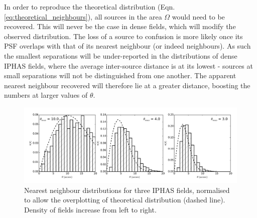 \documentclass[a4paper,useAMS,usenatbib]{mn2e}
\begin{document}


In order to reproduce the theoretical distribution (Eqn. \ref{eq:theoretical_neighbours}), all sources in the area $\Omega$ would need to be recovered. This will never be the case in dense fields, which will modify the observed distribution. The loss of a source to confusion is more likely once its PSF overlaps with that of its nearest neighbour (or indeed neighbours). As such
the smallest separations will be under-reported in the distributions of dense
IPHAS fields, where the average inter-source distance is at its lowest - sources at small separations will not be distinguished from one another. The apparent nearest neighbour recovered will therefore lie at a greater distance, boosting the numbers at larger values of $\theta$.

\begin{figure}
\begin{center}
\includegraphics[width=1\textwidth]{figures/neighbours_aquila.pdf} 
\caption{\footnotesize Nearest neighbour distributions for three IPHAS fields, 
normalised to allow the overplotting of theoretical distribution (dashed line).
 Density of fields increase from left to right.}
\label{fig:iphasfield_neighbours}
\end{center}
\end{figure}
\end{document}
